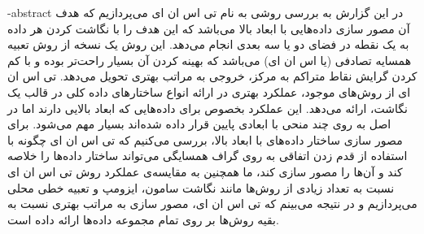 \department{}
\surname{}

\fa-abstract{
در این گزارش به بررسی روشی به نام تی اس ان ای می‌پردازیم که هدف آن مصور سازی داده‌هایی با ابعاد بالا می‌باشد که این هدف را با نگاشت کردن هر داده به یک نقطه در فضای دو یا سه بعدی انجام می‌دهد. این روش یک نسخه از روش تعبیه همسایه تصادفی (یا اس ان ای) می‌باشد که بهینه کردن آن بسیار راحت‌تر بوده و با کم کردن گرایش نقاط متراکم به مرکز، خروجی به مراتب بهتری تحویل می‌دهد. تی اس ان ای از روش‌های موجود، عملکرد بهتری در ارائه انواع ساختارهای داده کلی در قالب یک نگاشت، ارائه می‌دهد. این عملکرد بخصوص برای داده‌هایی که ابعاد بالایی دارند اما در اصل به روی چند منحی با ابعادی پایین قرار داده شده‌اند بسیار مهم می‌شود. برای مصور سازی ساختار داده‌های با ابعاد بالا، بررسی می‌کنیم که تی اس ان ای چگونه با استفاده از قدم زدن اتفاقی به روی گراف همسایگی می‌تواند ساختار داده‌ها را خلاصه کند و آن‌ها را مصور سازی کند، ما همچنین به مقایسه‌ی عملکرد روش تی اس ان ای نسبت به تعداد زیادی از روش‌ها مانند نگاشت سامون، ایزومپ و تعبیه خطی محلی می‌پردازیم و در نتیجه می‌بینم که تی اس ان ای، مصور سازی به مراتب بهتری نسبت به بقیه روش‌ها بر روی تمام مجموعه داده‌ها ارائه داده است.
}





\AUTtitle
